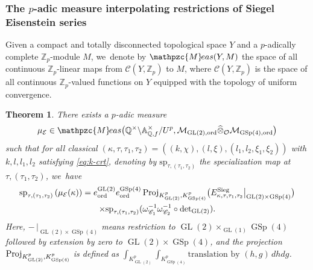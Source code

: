 \documentclass[JEP,XML,SOM,Unicode,published]{cedram}
\theoremstyle{plain}
\newtheorem{thm}{Theorem}[subsection]
\theoremstyle{remark}
\let\mr\mathrm
\newcommand{\bA}{\mathbb{A}}
\newcommand{\bQ}{\mathbb{Q}}
\newcommand{\bZ}{\mathbb{Z}}
\newcommand{\cE}{\mathcal{E}}
\newcommand{\cM}{\mathcal{M}}
\newcommand{\cO}{\mathcal{O}}
\newcommand{\sC}{\mathscr{C}}
\DeclareMathOperator{\GL}{GL}
\DeclareMathOperator{\GSp}{GSp}
\newcommand{\Meas}{\mathpzc{M}\mkern-2mu eas}
\newcommand{\ord}{\mathrm{ord}}
\newcommand{\Sieg}{\mr{Sieg}}
\newcommand{\spe}{\mathrm{sp}}
\let\wh\widehat
\begin{document}
\subsubsection{The \texorpdfstring{$p$}{p}-adic measure interpolating restrictions of Siegel Eisenstein series}
Given a compact and totally disconnected topological space $Y$ and a $p$-adically complete $\bZ_p$-module $M$, we~denote by $\Meas(Y,M)$ the space of all continuous $\bZ_p$-linear maps from $\sC(Y,\bZ_p)$ to $M$, where $\sC(Y,\bZ_p)$ is the space of all continuous $\bZ_p$-valued functions on $Y$ equipped with the topology of uniform convergence.
\begin{thm}\label{thm:EisF}
There exists a $p$-adic measure
\[
\mu_\cE\in\Meas\bigl(\bQ^\times\backslash\bA^\times_{\bQ,f}/U^p,\cM_{\GL(2),\ord}\wh{\otimes}_{\cO} \cM_{\GSp(4),\ord} \bigr)
\]
such that for all classical $(\kappa,\tau,\tau_1,\tau_2)=((k,\chi),(l,\xi),(l_1,l_2,\xi_1,\xi_2))$ with $k,l,l_1,l_2$ satisfying \eqref{eq:k-crt}, denoting by $\spe_{\tau,(\tau_1,\tau_2)}$ the specialization map at $\tau,(\tau_1,\tau_2)$, we~have
\begin{multline*}
\spe_{\tau,(\tau_1,\tau_2)}\left(\mu_\cE(\kappa)\right)
=e^{\GL(2)}_\ord e^{\GSp(4)}_\ord \,{\rm Proj}_{K^p_{\GL(2)},K^p_{\GSp(4)}} \bigl(E^\Sieg_{\kappa,\tau,\tau_1,\tau_2}\big|_{\GL(2)\times\GSp(4)} \bigr)\\
\times \spe_{\tau,(\tau_1,\tau_2)}(\omega^{-1}_{\sC_1}\omega^{-1}_{\sC_2}\circ{\rm det}_{\GL(2)}).
\end{multline*}
Here, $-\,|_{\GL(2)\times\GSp(4)}$ means restriction to $\GL(2)\times_{\GL(1)}\GSp(4)$ followed by extension by zero to $\GL(2)\times\GSp(4)$, and the projection ${\rm Proj}_{K^p_{\GL(2)},K^p_{\GSp(4)}}$ is defined as $\int_{K^p_{\GL(2)}}\int_{K^p_{\GSp(4)}} \text{translation by }(h,g)\,dh dg$.
\end{thm}
\end{document}

